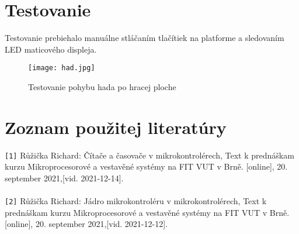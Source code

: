 \documentclass[a4paper, 11pt]{article}
\begin{document}
\section{Testovanie}
Testovanie prebiehalo manuálne stláčaním tlačítiek na platforme a sledovaním LED maticového displeja. 
\begin{figure}[h]
\begin{center}
\texttt{[image: had.jpg]}
\caption{Testovanie pohybu hada po hracej ploche}
\end{center}
\end{figure}
\pagebreak
\section{Zoznam použitej literatúry}
\verb|[1]| Růžička Richard: Čítače a časovače v mikrokontrolérech, Text k prednáškam kurzu Mikroprocesorové a vestavěné systémy na FIT VUT v Brně. [online], 20. september 2021,[vid. 2021-12-14].  \\\\
\verb|[2]| Růžička Richard: Jádro mikrokontroléru
v mikrokontrolérech, Text k prednáškam kurzu Mikroprocesorové a vestavěné systémy na FIT VUT v Brně. [online], 20. september 2021,[vid. 2021-12-12].
\end{document}
